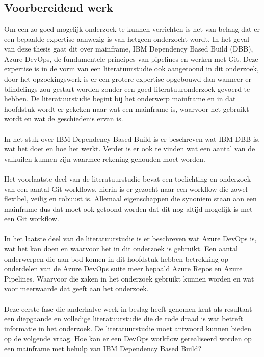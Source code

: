 
\chapter{}%
\label{ch:methodologie}

\section{Voorbereidend werk}
\label{sec:voorbereidend werk}
Om een zo goed mogelijk onderzoek te kunnen verrichten is het van belang dat er een bepaalde expertise aanwezig is van hetgeen onderzocht wordt. In het geval van deze thesis gaat dit over mainframe, IBM Dependency Based Build (DBB), Azure DevOps, de fundamentele principes van pipelines en werken met Git. Deze expertise is in de vorm van een literatuurstudie ook aangetoond in dit onderzoek, door het opzoekingswerk is er een grotere expertise opgebouwd dan wanneer er blindelings zou gestart worden zonder een goed literatuuronderzoek gevoerd te hebben. De literatuurstudie begint bij het onderwerp mainframe en in dat hoofdstuk wordt er gekeken naar wat een mainframe is, waarvoor het gebruikt wordt en wat de geschiedenis ervan is.
\\ \\
In het stuk over IBM Dependency Based Build is er beschreven wat IBM DBB is, wat het doet en hoe het werkt. 
Verder is er ook te vinden wat een aantal van de valkuilen kunnen zijn waarmee rekening gehouden moet worden.
\\ \\
Het voorlaatste deel van de literatuurstudie bevat een toelichting en onderzoek van een aantal Git workflows, hierin is er gezocht naar een workflow die zowel flexibel, veilig en robuust is.
Allemaal eigenschappen die synoniem staan aan een mainframe dus dat moet ook getoond worden dat dit nog altijd mogelijk is met een Git workflow.
\\ \\
In het laatste deel van de literatuurstudie is er beschreven wat Azure DevOps is, wat het kan doen en waarvoor het in dit onderzoek is gebruikt.
Een aantal onderwerpen die aan bod komen in dit hoofdstuk hebben betrekking op onderdelen van de Azure DevOps suite meer bepaald Azure Repos en Azure Pipelines.
Waarvoor die zaken in het onderzoek gebruikt kunnen worden en wat voor meerwaarde dat geeft aan het onderzoek.
\\ \\
Deze eerste fase die anderhalve week in beslag heeft genomen kent als resultaat een diepgaande en volledige literatuurstudie die de rode draad is wat betreft informatie in het onderzoek. De literatuurstudie moet antwoord kunnen bieden op de volgende vraag. Hoe kan er een DevOps workflow gerealiseerd worden op een mainframe met behulp van IBM Dependency Based Build?

